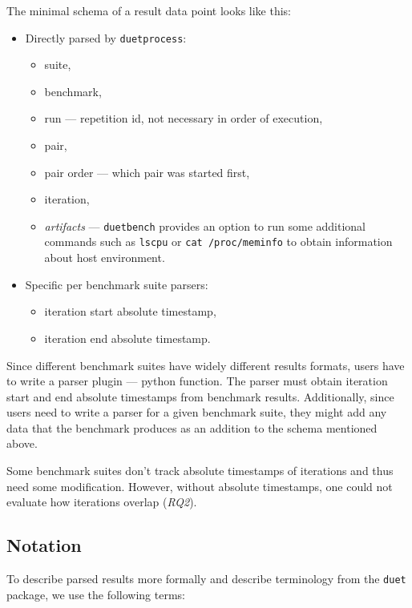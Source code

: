 The minimal schema of a result data point looks like this:
\begin{itemize}
    \item Directly parsed by \lstinline{duetprocess}:
        \begin{itemize}
            \item suite,
            \item benchmark,
            \item run --- repetition id, not necessary in  order of execution,
            \item pair,
            \item pair order --- which pair was started first,
            \item iteration,
            \item \emph{artifacts} --- \lstinline{duetbench} provides an option to run some additional commands such as \lstinline{lscpu} or \lstinline{cat /proc/meminfo} to obtain information about host environment.
        \end{itemize}
    \item Specific per benchmark suite parsers:
        \begin{itemize}
            \item iteration start absolute timestamp,
            \item iteration end absolute timestamp.
        \end{itemize}
\end{itemize}

Since different benchmark suites have widely different results formats, users have to write a parser plugin --- python function.
The parser must obtain iteration start and end absolute timestamps from benchmark results. 
Additionally, since users need to write a parser for a given benchmark suite, they might add any data that the benchmark produces as an addition to the schema mentioned above.

Some benchmark suites don't track absolute timestamps of iterations and thus need some modification.
However, without absolute timestamps, one could not evaluate how iterations overlap (\emph{RQ2}).

\subsection{Notation}
\label{sec:notation}

To describe parsed results more formally and describe terminology from the \lstinline{duet} package, we use the following terms:

